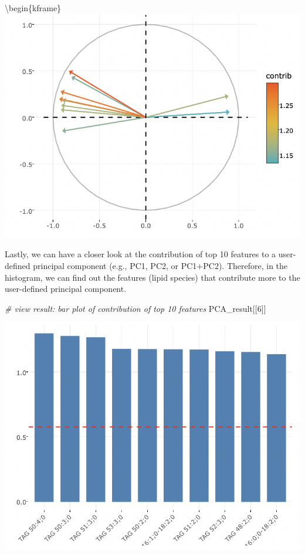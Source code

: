 \documentclass[]{article}
\newcommand{\hlnum}[1]{\textcolor[rgb]{0.816,0.125,0.439}{#1}}%
\newcommand{\hlcom}[1]{\textcolor[rgb]{0.502,0.502,0.502}{\textit{#1}}}%
\newcommand{\hlstd}[1]{\textcolor[rgb]{0.251,0.251,0.251}{#1}}%
\newenvironment{Shaded}{\begin{myshaded}}{\end{myshaded}}
\newcommand{\DecValTok}[1]{\hlnum{#1}}
\newcommand{\CommentTok}[1]{\hlcom{#1}}
\newcommand{\NormalTok}[1]{\hlstd{#1}}
\begin{document}
\textbackslash begin\{kframe\}
\includegraphics{./image/pca_variable.png}

Lastly, we can have a closer look at the contribution of top 10 features to a user-defined principal component (e.g., PC1, PC2, or PC1+PC2). Therefore, in the histogram, we can find out the features (lipid species) that contribute more to the user-defined principal component.

\begin{Shaded}
\begin{Highlighting}[]
\CommentTok{# view result: bar plot of contribution of top 10 features}
\NormalTok{PCA_result[[}\DecValTok{6}\NormalTok{]]  }
\end{Highlighting}
\end{Shaded}

\includegraphics{./image/pca_feature_contrib.png}
\end{document}
